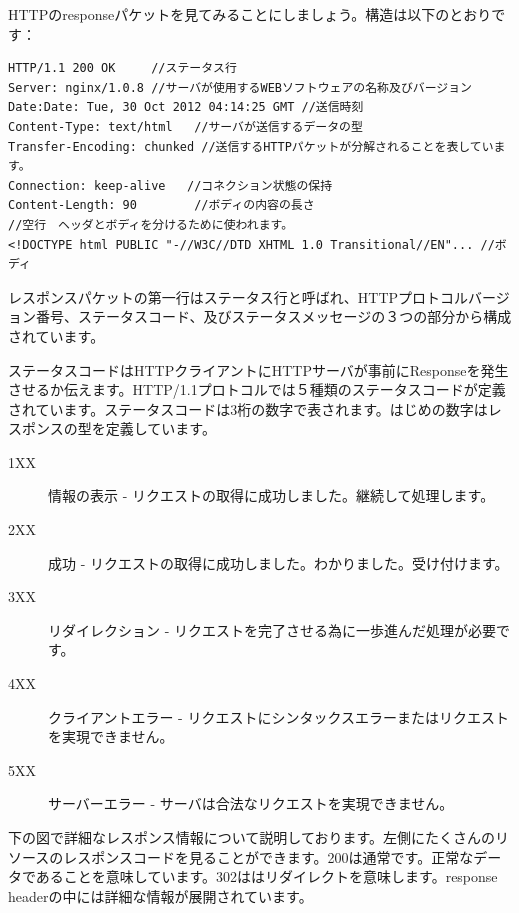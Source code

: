 HTTPのresponseパケットを見てみることにしましょう。構造は以下のとおりです：

\begin{lstlisting}[numbers=none]
HTTP/1.1 200 OK     //ステータス行
Server: nginx/1.0.8 //サーバが使用するWEBソフトウェアの名称及びバージョン
Date:Date: Tue, 30 Oct 2012 04:14:25 GMT //送信時刻
Content-Type: text/html   //サーバが送信するデータの型
Transfer-Encoding: chunked //送信するHTTPパケットが分解されることを表しています。
Connection: keep-alive   //コネクション状態の保持
Content-Length: 90        //ボディの内容の長さ
//空行　ヘッダとボディを分けるために使われます。
<!DOCTYPE html PUBLIC "-//W3C//DTD XHTML 1.0 Transitional//EN"... //ボディ
\end{lstlisting}

レスポンスパケットの第一行はステータス行と呼ばれ、HTTPプロトコルバージョン番号、ステータスコード、及びステータスメッセージの３つの部分から構成されています。

ステータスコードはHTTPクライアントにHTTPサーバが事前にResponseを発生させるか伝えます。HTTP/1.1プロトコルでは５種類のステータスコードが定義されています。ステータスコードは3桁の数字で表されます。はじめの数字はレスポンスの型を定義しています。

\begin{description}
  \item[1XX] 情報の表示 - リクエストの取得に成功しました。継続して処理します。
  \item[2XX] 成功 - リクエストの取得に成功しました。わかりました。受け付けます。
  \item[3XX] リダイレクション - リクエストを完了させる為に一歩進んだ処理が必要です。
  \item[4XX] クライアントエラー - リクエストにシンタックスエラーまたはリクエストを実現できません。
  \item[5XX] サーバーエラー - サーバは合法なリクエストを実現できません。
\end{description}

下の図で詳細なレスポンス情報について説明しております。左側にたくさんのリソースのレスポンスコードを見ることができます。200は通常です。正常なデータであることを意味しています。302ははリダイレクトを意味します。response headerの中には詳細な情報が展開されています。

